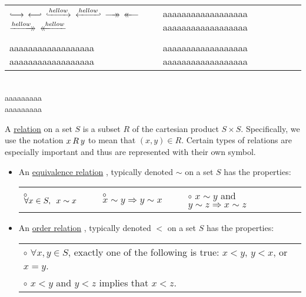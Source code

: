 \documentclass{book}
\newcommand{\Hooklongrightarrow}{\lhook\joinrel\longrightarrow}
\newcommand{\Hooklongleftarrow}{\longleftarrow\joinrel\rhook}
\newcommand{\Hookxlongrightarrow}[2][]{\lhook\joinrel\xrightarrow[#1]{#2}}
\newcommand{\Hookxlongleftarrow}[2][]{\xleftarrow[#1]{#2}\joinrel\rhook}
\newcommand{\longrightarrowdbl}{\longrightarrow\mathrel{\mkern-14mu}\rightarrow}
\newcommand{\longleftarrowdbl}{\leftarrow\mathrel{\mkern-14mu}\longleftarrow}
\newcommand{\xrightarrowdbl}[2][]{%
  \xrightarrow[#1]{#2}\mathrel{\mkern-14mu}\rightarrow
}
\newcommand{\xleftarrowdbl}[2][]{%
  \leftarrow\mathrel{\mkern-14mu}\xleftarrow[#1]{#2}
}
\newcommand{\udefine}[1]{{%
   \setulcolor{Red}%
   \setul{0.14em}{0.07em}%
   \ul{#1}%
}}
\newcommand{\myHS}{ \hspace{0.5em}}
\begin{document}
   
   \begin{tabular}{p{2in} p{4in}}
      $\Hooklongrightarrow$ 
      $\Hooklongleftarrow$ 
      $\Hookxlongrightarrow{hellow}$ 
      $\Hookxlongleftarrow{hellow}$\newline
      $\longrightarrowdbl$ 
      $\longleftarrowdbl$ 
      $\xrightarrowdbl{hellow}$ 
      $\xleftarrowdbl{hellow}$ &

      aaaaaaaaaaaaaaaaaa\newline
      aaaaaaaaaaaaaaaaaa\\ \\

      aaaaaaaaaaaaaaaaaa\newline
      aaaaaaaaaaaaaaaaaa &

      aaaaaaaaaaaaaaaaaa\newline
      aaaaaaaaaaaaaaaaaa
   \end{tabular}\\

   aaaaaaaaa\\
   aaaaaaaaa


   \newpage

   A \udefine{relation} on a set $S$ is a subset $R$ of the cartesian product $S \times S$. Specifically, we\\ use the notation $x \hspace{0.2em}R\hspace{0.2em} y$ to mean that $(x, y) \in R$. Certain types of relations are\\ especially important and thus are represented with their own symbol.
   \begin{itemize}
      \item An \udefine{equivalence relation}, typically denoted $\sim$ on a set $S$ has the properties:\\
      \begin{tabular}{l c l c l}
         $\circ$ $\forall x \in S,\myHS x \sim x$ &\quad& $\circ$ $x \sim y \Longrightarrow y \sim x$ &\quad& $\circ$ $x \sim y$ and $y \sim z \Longrightarrow x \sim z$
      \end{tabular}

      \item An \udefine{order relation}, typically denoted $<$ on a set $S$ has the properties:\\
      \begin{tabular}{l}
         $\circ$ $\forall x, y \in S$, exactly one of the following is true: $x < y$, $y < x$, or $x = y$.\\
         $\circ$ $x < y$ and $y < z$ implies that $x < z$.
      \end{tabular}
   \end{itemize}
\end{document}
